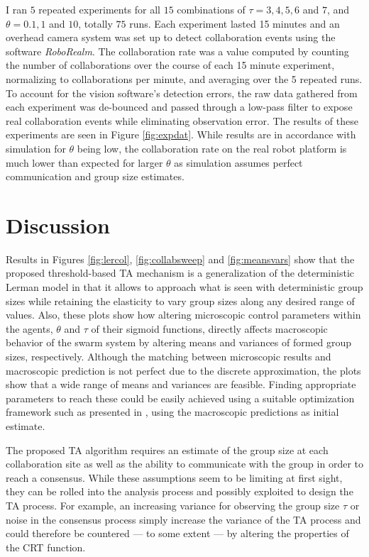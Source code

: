 \documentclass[defaultstyle,12pt]{thesis}
\begin{document}
I ran $5$ repeated experiments for all $15$ combinations of $\tau = 3,4,5,6$ and $7$, and $\theta = 0.1, 1$ and $10$, totally $75$ runs. Each experiment lasted 15 minutes and an overhead camera system was set up to detect collaboration events using the software \emph{RoboRealm}. The collaboration rate was a value computed by counting the number of collaborations over the course of each 15 minute experiment, normalizing to collaborations per minute, and averaging over the 5 repeated runs. 
To account for the vision software's detection errors, the raw data gathered from each experiment was de-bounced and passed through a low-pass filter to expose real collaboration events while eliminating observation error. The results of these experiments are seen in Figure \ref{fig:expdat}. While results are in accordance with simulation for $\theta$ being low, the collaboration rate on the real robot platform is much lower than expected for larger $\theta$ as simulation assumes perfect communication and group size estimates.


\section{Discussion}
Results in Figures \ref{fig:lercol}, \ref{fig:collabsweep} and \ref{fig:meansvars} show that the proposed threshold-based TA mechanism is a generalization of the deterministic Lerman model in that it allows to approach what is seen with deterministic group sizes while retaining the elasticity to vary group sizes along any desired range of values. Also, these plots show how altering microscopic control parameters within the agents, $\theta$ and $\tau$ of their sigmoid functions, directly affects macroscopic behavior of the swarm system by altering means and variances of formed group sizes, respectively. Although the matching between microscopic results and macroscopic prediction is not perfect due to the discrete approximation, the plots show that a wide range of means and variances are feasible. Finding appropriate parameters to reach these could be easily achieved using a suitable optimization framework such as presented in \cite{Correll2008,Berman2009}, using the macroscopic predictions as initial estimate. 

The proposed TA algorithm requires an estimate of the group size at each collaboration site as well as the ability to communicate with the group in order to reach a consensus. While these assumptions seem to be limiting at first sight, they can be rolled into the analysis process and possibly exploited to design the TA process. For example, an increasing variance for observing the group size $\tau$ or noise in the consensus process simply increase the variance of the TA process and could therefore be countered --- to some extent --- by altering the properties of the CRT function. 
\end{document}
